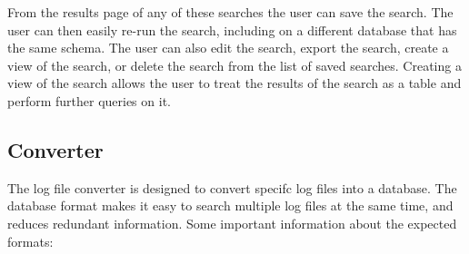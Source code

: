 \documentclass[letterpaper,11pt,twoside,final]{article}
\begin{document}
From the results page of any of these searches the user can save the
search. The user can then easily re-run the search, including on a
different database that has the same schema. The user can also edit
the search, export the search, create a view of the search, or delete
the search from the list of saved searches. Creating a view of the
search allows the user to treat the results of the search as a table
and perform further queries on it.

\subsection*{Converter}
The log file converter is designed to convert specifc log files into a database. The database format makes it easy to search
multiple log files at the same time, and reduces redundant
information. Some important information about the expected formats:
\end{document}

